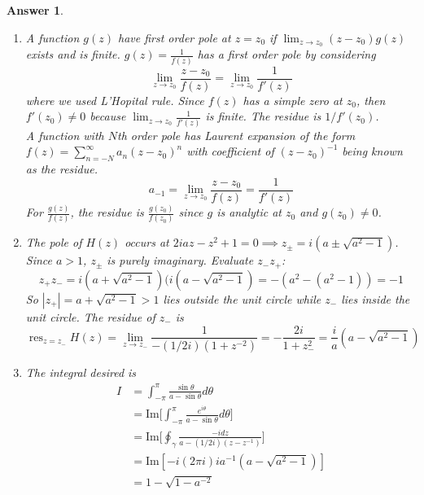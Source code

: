\documentclass[a4paper]{article}
\DeclareMathOperator{\res}{res}
\newtheorem{ans}{Answer}[section]
\theoremstyle{new}
\begin{document}
\begin{ans}\leavevmode
\begin{enumerate}[label=(\alph*)]
\item A function $g(z)$ have first order pole at $z=z_0$ if $\lim_{z\rightarrow z_0}(z-z_0)g(z)$ exists and is finite. $g(z)=\frac{1}{f(z)}$ has a first order pole by considering
$$\lim_{z\rightarrow z_0}\frac{z-z_0}{f(z)}=\lim_{z\rightarrow z_0}\frac{1}{f'(z)}$$
where we used L'Hopital rule. Since $f(z)$ has a simple zero at $z_0$, then $f'(z_0)\neq 0$ because $\lim_{z\rightarrow z_0}\frac{1}{f'(z)}$ is finite. The residue is $1/f'(z_0)$.\\[5pt]
A function with $N$th order pole has Laurent expansion of the form $f(z)=\sum_{n=-N}^\infty a_n(z-z_0)^n$ with coefficient of $(z-z_0)^{-1}$ being known as the residue. 
$$a_{-1}=\lim_{z\rightarrow z_0}\frac{z-z_0}{f(z)}=\frac{1}{f'(z)}$$
For $\frac{g(z)}{f(z)}$, the residue is $\frac{g(z_0)}{f(z_0)}$ since $g$ is analytic at $z_0$ and $g(z_0)\neq 0$.
\item The pole of $H(z)$ occurs at $2iaz-z^2+1=0\implies z_{\pm}=i(a\pm\sqrt{a^2-1})$. Since $a>1$, $z_\pm$ is purely imaginary. Evaluate $z_-z_+$:
$$z_+z_-=i(a+\sqrt{a^2-1})(i(a-\sqrt{a^2-1})=-(a^2-(a^2-1))=-1$$
So $|z_+|=a+\sqrt{a^2-1}>1$ lies outside the unit circle while $z_-$ lies inside the unit circle. The residue of $z_-$ is
$$\res_{z=z_-}H(z)=\lim_{z\rightarrow z_-}\frac{1}{-(1/2i)(1+z^{-2})}=-\frac{2i}{1+z_-^2}=\frac{i}{a}(a-\sqrt{a^2-1})$$
\item The integral desired is
\begin{align}
I&=\int_{-\pi}^\pi\frac{\sin\theta}{a-\sin\theta}d\theta\nonumber\\&=\text{Im}\bigg[\int_{-\pi}^\pi\frac{e^{i\theta}}{a-\sin\theta}d\theta\bigg]\nonumber\\&=\text{Im}\bigg[\oint_\gamma\frac{-idz}{a-(1/2i)(z-z^{-1})}\bigg]\nonumber\\&=\text{Im}[-i(2\pi i)ia^{-1}(a-\sqrt{a^2-1})]\nonumber\\&=1-\sqrt{1-a^{-2}}\nonumber
\end{align}
\end{enumerate}
\end{ans}
\newpage
\end{document}
